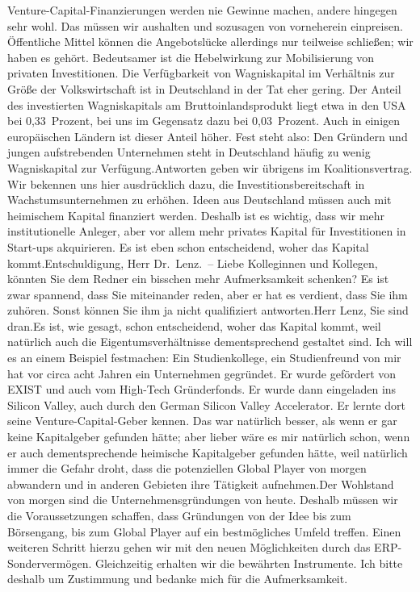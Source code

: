 \documentclass{article}
\begin{document}
Venture-Capital-Finanzierungen werden nie Gewinne machen, andere hingegen sehr wohl. Das müssen wir aushalten und sozusagen von vorneherein einpreisen. Öffentliche Mittel können die Angebotslücke allerdings nur teilweise schließen; wir haben es gehört. Bedeutsamer ist die Hebelwirkung zur Mobilisierung von privaten Investitionen. Die Verfügbarkeit von Wagniskapital im Verhältnis zur Größe der Volkswirtschaft ist in Deutschland in der Tat eher gering. Der Anteil des investierten Wagniskapitals am Bruttoinlandsprodukt liegt etwa in den USA bei 0,33 Prozent, bei uns im Gegensatz dazu bei 0,03 Prozent. Auch in einigen europäischen Ländern ist dieser Anteil höher. Fest steht also: Den Gründern und jungen aufstrebenden Unternehmen steht in Deutschland häufig zu wenig Wagniskapital zur Verfügung.Antworten geben wir übrigens im Koalitionsvertrag. Wir bekennen uns hier ausdrücklich dazu, die Investitionsbereitschaft in Wachstumsunternehmen zu erhöhen. Ideen aus Deutschland müssen auch mit heimischem Kapital finanziert werden. Deshalb ist es wichtig, dass wir mehr institutionelle Anleger, aber vor allem mehr privates Kapital für Investitionen in Start-ups akquirieren. Es ist eben schon entscheidend, woher das Kapital kommt.Entschuldigung, Herr Dr. Lenz. – Liebe Kolleginnen und Kollegen, könnten Sie dem Redner ein bisschen mehr Aufmerksamkeit schenken? Es ist zwar spannend, dass Sie miteinander reden, aber er hat es verdient, dass Sie ihm zuhören. Sonst können Sie ihm ja nicht qualifiziert antworten.Herr Lenz, Sie sind dran.Es ist, wie gesagt, schon entscheidend, woher das Kapital kommt, weil natürlich auch die Eigentumsverhältnisse dementsprechend gestaltet sind. Ich will es an einem Beispiel festmachen: Ein Studienkollege, ein Studienfreund von mir hat vor circa acht Jahren ein Unternehmen gegründet. Er wurde gefördert von EXIST und auch vom High-Tech Gründerfonds. Er wurde dann eingeladen ins Silicon Valley, auch durch den German Silicon Valley Accelerator. Er lernte dort seine Venture-Capital-Geber kennen. Das war natürlich besser, als wenn er gar keine Kapitalgeber gefunden hätte; aber lieber wäre es mir natürlich schon, wenn er auch dementsprechende heimische Kapitalgeber gefunden hätte, weil natürlich immer die Gefahr droht, dass die potenziellen Global Player von morgen abwandern und in anderen Gebieten ihre Tätigkeit aufnehmen.Der Wohlstand von morgen sind die Unternehmensgründungen von heute. Deshalb müssen wir die Voraussetzungen schaffen, dass Gründungen von der Idee bis zum Börsengang, bis zum Global Player auf ein bestmögliches Umfeld treffen. Einen weiteren Schritt hierzu gehen wir mit den neuen Möglichkeiten durch das ERP-Sondervermögen. Gleichzeitig erhalten wir die bewährten Instrumente. Ich bitte deshalb um Zustimmung und bedanke mich für die Aufmerksamkeit.
\end{document}
